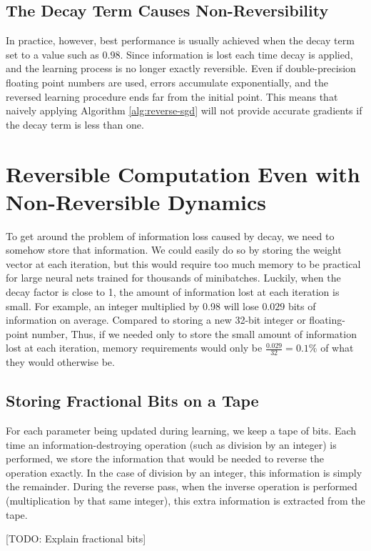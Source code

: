 \documentclass{article}
\begin{document}
\subsection{The Decay Term Causes Non-Reversibility}
In practice, however, best performance is usually achieved when the decay term set to a value such as $0.98$.
Since information is lost each time decay is applied, and the learning process is no longer exactly reversible.
Even if double-precision floating point numbers are used, errors accumulate exponentially, and the reversed learning procedure ends far from the initial point.
This means that naively applying Algorithm \ref{alg:reverse-sgd} will not provide accurate gradients if the decay term is less than one.

\section{Reversible Computation Even with Non-Reversible Dynamics}

To get around the problem of information loss caused by decay, we need to somehow store that information.
We could easily do so by storing the weight vector at each iteration, but this would require too much memory to be practical for large neural nets trained for thousands of minibatches.
Luckily, when the decay factor is close to 1, the amount of information lost at each iteration is small.
For example, an integer multiplied by 0.98 will lose $0.029$ bits of information on average.
Compared to storing a new 32-bit integer or floating-point number, 
Thus, if we needed only to store the small amount of information lost at each iteration, memory requirements would only be ${\frac{0.029}{32} = 0.1\%}$ of what they would otherwise be.

\subsection{Storing Fractional Bits on a Tape}

For each parameter being updated during learning, we keep a tape of bits.
Each time an information-destroying operation (such as division by an integer) is performed, we store the information that would be needed to reverse the operation exactly.  In the case of division by an integer, this information is simply the remainder.
During the reverse pass, when the inverse operation is performed (multiplication by that same integer), this extra information is extracted from the tape.

[TODO: Explain fractional bits]
\end{document}
